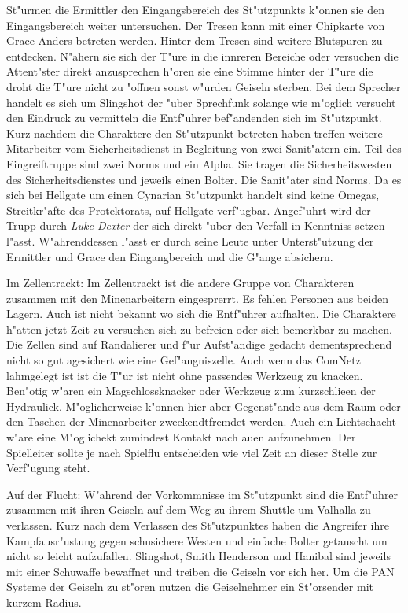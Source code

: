 St"urmen die Ermittler den Eingangsbereich des St"utzpunkts k"onnen sie den Eingangsbereich weiter untersuchen. Der Tresen kann mit einer Chipkarte von Grace Anders betreten werden. Hinter dem Tresen sind weitere Blutspuren zu entdecken. N"ahern sie sich der T"ure in die innreren Bereiche oder versuchen die Attent"ster direkt anzusprechen h"oren sie eine Stimme hinter der T"ure die droht die T"ure nicht zu "offnen sonst w"urden Geiseln sterben. Bei dem Sprecher handelt es sich um Slingshot der "uber Sprechfunk solange wie m"oglich versucht den Eindruck zu vermitteln die Entf"uhrer bef"andenden sich im St"utzpunkt. Kurz nachdem die Charaktere den St"utzpunkt betreten haben treffen  weitere Mitarbeiter vom Sicherheitsdienst in Begleitung von zwei Sanit"atern ein. Teil des Eingreiftruppe sind zwei Norms und ein Alpha. Sie tragen die Sicherheitswesten des Sicherheitsdienstes und jeweils einen Bolter. Die Sanit"ater sind Norms. Da es sich bei Hellgate um einen Cynarian St"utzpunkt handelt sind keine Omegas, Streitkr"afte des Protektorats, auf Hellgate verf"ugbar. Angef"uhrt wird der Trupp durch \emph{Luke Dexter} der sich direkt "uber den Verfall in Kenntniss setzen l"asst. W"ahrenddessen l"asst er durch seine Leute unter Unterst"utzung der Ermittler und Grace den Eingangbereich und die G"ange absichern. 

Im Zellentrackt: Im Zellentrackt ist die andere Gruppe von Charakteren zusammen mit den Minenarbeitern eingesprerrt. Es fehlen Personen aus beiden Lagern. Auch ist nicht bekannt wo sich die Entf"uhrer aufhalten. Die Charaktere h"atten jetzt Zeit zu versuchen sich zu befreien oder sich bemerkbar zu machen. Die Zellen sind auf Randalierer und f"ur Aufst"andige gedacht dementsprechend nicht so gut agesichert wie eine Gef"angniszelle. Auch wenn das ComNetz lahmgelegt ist ist die T"ur ist nicht ohne passendes Werkzeug zu knacken.  Ben"otig w"aren ein Magschlossknacker oder Werkzeug zum kurzschlie\3en der Hydraulick. M"oglicherweise k"onnen hier aber Gegenst"ande aus dem Raum oder den 
Taschen der Minenarbeiter zweckendtfremdet werden. Auch ein Lichtschacht w"are eine M"oglichekt zumindest Kontakt nach au\3en aufzunehmen. 
Der Spielleiter sollte je nach Spielflu\3 entscheiden wie viel Zeit an dieser Stelle zur Verf"ugung steht.

Auf der Flucht: W"ahrend der Vorkommnisse im St"utzpunkt sind die Entf"uhrer zusammen mit ihren Geiseln auf dem Weg zu ihrem Shuttle um Valhalla zu verlassen. Kurz nach dem Verlassen des St"utzpunktes haben die Angreifer ihre Kampfausr"ustung gegen schu\3sichere Westen und einfache Bolter getauscht um nicht so leicht aufzufallen. Slingshot, Smith Henderson und Hanibal sind jeweils mit einer Schu\3waffe bewaffnet und treiben die Geiseln vor sich her. Um die PAN Systeme der Geiseln zu st"oren nutzen die Geiselnehmer ein St"orsender mit kurzem Radius.


